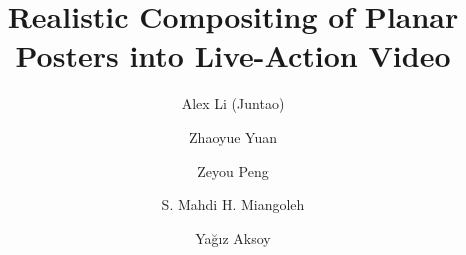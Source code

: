 \documentclass[sigconf]{acmart}
\begin{document}
\title{Realistic Compositing of Planar Posters into Live-Action Video}

\author{Alex Li (Juntao)}

\author{Zhaoyue Yuan}
\authornotemark[1]

\author{Zeyou Peng}
\authornotemark[1]

\author{S. Mahdi H. Miangoleh}

\author{Ya\u{g}{\i}z Aksoy}

\renewcommand{\shortauthors}{[Surname1] and [Surname2] et al.}





\end{document}
